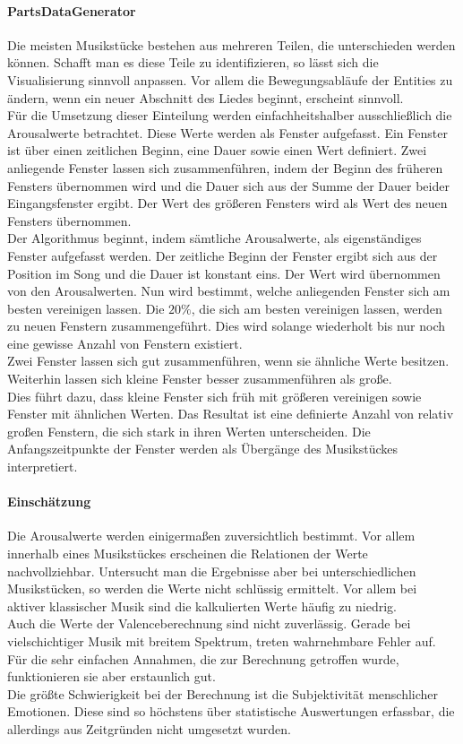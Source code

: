 \documentclass[11pt,a4paper]{article}
\begin{document}
\paragraph{PartsDataGenerator}
Die meisten Musikstücke bestehen aus mehreren Teilen, die unterschieden werden können. Schafft man es diese Teile zu identifizieren, so lässt sich die Visualisierung sinnvoll anpassen. Vor allem die Bewegungsabläufe der Entities zu ändern, wenn ein neuer Abschnitt des Liedes beginnt, erscheint sinnvoll.\\
Für die Umsetzung dieser Einteilung werden einfachheitshalber ausschließlich die Arousalwerte betrachtet. Diese Werte werden als Fenster aufgefasst. Ein Fenster ist über einen zeitlichen Beginn, eine Dauer sowie einen Wert definiert. Zwei anliegende Fenster lassen sich zusammenführen, indem der Beginn des früheren Fensters übernommen wird und die Dauer sich aus der Summe der Dauer beider Eingangsfenster ergibt. Der Wert des größeren Fensters wird als Wert des neuen Fensters übernommen.\\
Der Algorithmus beginnt, indem sämtliche Arousalwerte, als eigenständiges Fenster aufgefasst werden. Der zeitliche Beginn der Fenster ergibt sich aus der Position im Song und die Dauer ist konstant eins. Der Wert wird übernommen von den Arousalwerten. Nun wird bestimmt, welche anliegenden Fenster sich am besten vereinigen lassen. Die $20\%$, die sich am besten vereinigen lassen, werden zu neuen Fenstern zusammengeführt. Dies wird solange wiederholt bis nur noch eine gewisse Anzahl von Fenstern existiert.\\
Zwei Fenster lassen sich gut zusammenführen, wenn sie ähnliche Werte besitzen. Weiterhin lassen sich kleine Fenster besser zusammenführen als große.\\
Dies führt dazu, dass kleine Fenster sich früh mit größeren vereinigen sowie Fenster mit ähnlichen Werten. Das Resultat ist eine definierte Anzahl von relativ großen Fenstern, die sich stark in ihren Werten unterscheiden. Die Anfangszeitpunkte der Fenster werden als Übergänge des Musikstückes interpretiert.

\paragraph{Einschätzung}
Die Arousalwerte werden einigermaßen zuversichtlich bestimmt. Vor allem innerhalb eines Musikstückes erscheinen die Relationen der Werte nachvollziehbar. Untersucht man die Ergebnisse aber bei unterschiedlichen Musikstücken, so werden die Werte nicht schlüssig ermittelt. Vor allem bei aktiver klassischer Musik sind die kalkulierten Werte häufig zu niedrig.\\
Auch die Werte der Valenceberechnung sind nicht zuverlässig. Gerade bei vielschichtiger Musik mit breitem Spektrum, treten wahrnehmbare Fehler auf. Für die sehr einfachen Annahmen, die zur Berechnung getroffen wurde, funktionieren sie aber erstaunlich gut.\\
Die größte Schwierigkeit bei der Berechnung ist die Subjektivität menschlicher Emotionen. Diese sind so höchstens über statistische Auswertungen erfassbar, die allerdings aus Zeitgründen nicht umgesetzt wurden.
\end{document}
